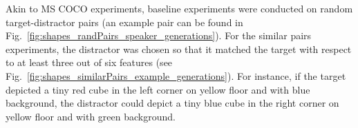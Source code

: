 Akin to MS COCO experiments, baseline experiments were conducted on random target-distractor pairs (an example pair can be found in Fig.~\ref{fig:shapes_randPairs_speaker_generations}). For the similar pairs experiments, the distractor was chosen so that it matched the target with respect to at least three out of six features (see Fig.~\ref{fig:shapes_similarPairs_example_generations}). For instance, if the target depicted a tiny red cube in the left corner on yellow floor and with blue background, the distractor could depict a tiny blue cube in the right corner on yellow floor and with green background.



